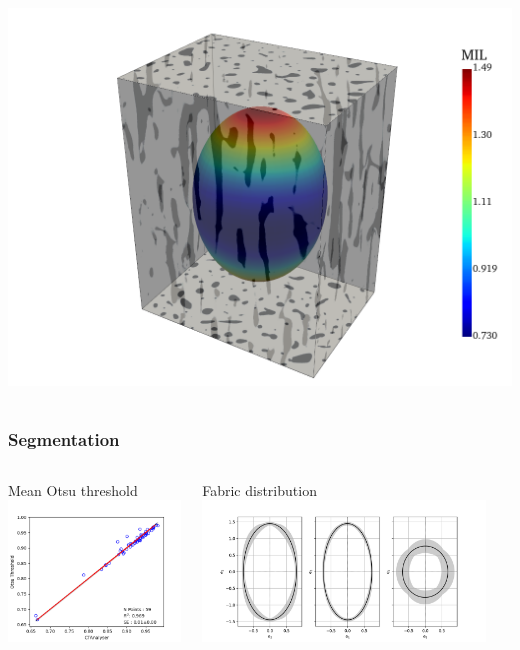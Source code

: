 \documentclass[xcolor=table,11pt]{beamer}
\begin{document}
\begin{frame}
\begin{columns}
			\includegraphics[width=\linewidth, trim=200 0 0 0]{01_Fabric/Plots/Fabric}\\

		\end{columns}
	\end{frame}

	\begin{frame}
		\frametitle{Segmentation}

		\begin{columns}

			\vfill
			\centering
			Mean Otsu threshold\\
			\vfill
			\includegraphics[height=3.75cm, trim=50 0 0 0]{01_Fabric/Results/BVTV_OLS}\\
			\vfill

			\vfill
			\centering
			Fabric distribution\\
			\vfill
			\includegraphics[height=3.75cm, trim=100 0 0 0]{01_Fabric/Results/Fabric}\\
			\vfill
			
		\end{columns}
	
	\end{frame}
\end{document}
